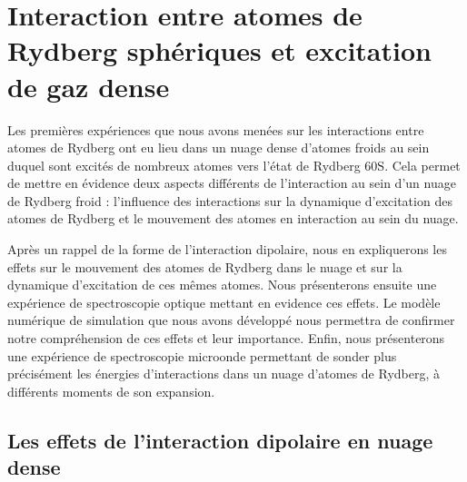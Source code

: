 \chapter{Interaction entre atomes de Rydberg sphériques et excitation de gaz dense}
\label{chapter:60s}
\noindent Les premières expériences que nous avons menées sur les interactions entre atomes de Rydberg ont eu lieu dans un nuage dense d'atomes froids au sein duquel sont excités de nombreux atomes vers l'état de Rydberg $\mathrm{60S}$.
Cela permet de mettre en évidence deux aspects différents de l'interaction au sein d'un nuage de Rydberg froid : l'influence des interactions sur la dynamique d'excitation des atomes de Rydberg et le mouvement des atomes en interaction au sein du nuage.

Après un rappel de la forme de l'interaction dipolaire, nous en expliquerons les effets sur le mouvement des atomes de Rydberg dans le nuage et sur la dynamique d'excitation de ces mêmes atomes.
Nous présenterons ensuite une expérience de spectroscopie optique mettant en evidence ces effets.
Le modèle numérique de simulation que nous avons développé nous permettra de confirmer notre compréhension de ces effets et leur importance.
Enfin, nous présenterons une expérience de spectroscopie microonde permettant de sonder plus précisément les énergies d'interactions dans un nuage d'atomes de Rydberg, à différents moments de son expansion.

\section{Les effets de l'interaction dipolaire en nuage dense}


